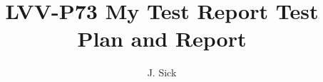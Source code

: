 \documentclass[DM,lsstdraft,toc]{lsstdoc}
\begin{document}
\def\milestoneName{My Test Report}
\def\milestoneId{LVV-P73}
\def\product{Data Management}


\title{LVV-P73 My Test Report Test Plan and Report}
\setDocRef{\lsstDocType-\lsstDocNum}
\date{\vcsdate}
\author{J. Sick}




\end{document}
